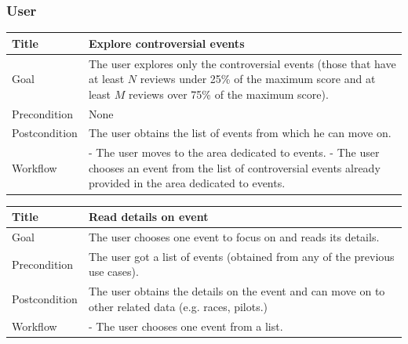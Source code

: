 \documentclass{beamer}
\begin{document}

\begin{frame}
    \frametitle{User}
    \begin{table}
        \tiny
        \begin{tabular}{|p{2cm}|p{6cm}|}
        \hline
        Title & \textbf{Explore controversial events} \\
        \hline
        Goal & The user explores only the controversial events (those that have at least $N$ reviews under 25\% of the maximum score
        and at least $M$ reviews over 75\% of the maximum score). \\
        \hline
        Precondition & None \\
        \hline
        Postcondition & The user obtains the list of events from which he can move on.\\
        \hline
        Workflow &
        - The user moves to the area dedicated to events. \newline
        - The user chooses an event from the list of controversial events already provided in the area dedicated to events. \\
        \hline
        \end{tabular}
\end{table}

\begin{table}
    \tiny
    \begin{tabular}{|p{2cm}|p{6cm}|}
    \hline
    Title & \textbf{Read details on event} \\
    \hline
    Goal & The user chooses one event to focus on and reads its details. \\
    \hline
    Precondition & The user got a list of events (obtained from any of the previous use cases).\\
    \hline
    Postcondition & The user obtains the details on the event and can move on to other related
    data (e.g. races, pilots.) \\
    \hline
    Workflow &
    - The user chooses one event from a list. \\
    \hline
    \end{tabular}
\end{table}
\end{frame}


\end{document}
